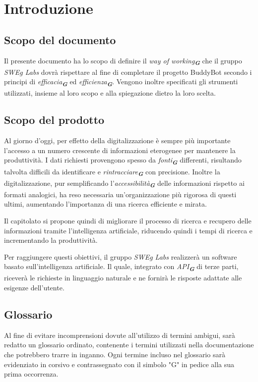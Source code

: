 


\section{Introduzione}
\label{sec:introduzione}

\subsection{Scopo del documento}
Il presente documento ha lo scopo di definire il \emph{way of working}\textsubscript{\textit{\textbf{G}}} che il gruppo \emph{SWEg Labs} dovrà rispettare al fine di completare il progetto BuddyBot secondo i principi di \emph{efficacia}\textsubscript{\textit{\textbf{G}}} ed \emph{efficienza}\textsubscript{\textit{\textbf{G}}}.
Vengono inoltre specificati gli strumenti utilizzati, insieme al loro scopo e alla spiegazione dietro la loro scelta.
\subsection{Scopo del prodotto}
Al giorno d'oggi, per effetto della digitalizzazione è sempre più importante l'accesso a un numero crescente di informazioni eterogenee per mantenere la produttività. I dati richiesti provengono spesso da  \emph{fonti}\textsubscript{\textit{\textbf{G}}} differenti, risultando talvolta difficili da identificare e  \emph{rintracciare}\textsubscript{\textit{\textbf{G}}} con precisione. Inoltre la digitalizzazione, pur semplificando l'\emph{accessibilità}\textsubscript{\textit{\textbf{G}}} delle informazioni rispetto ai formati analogici, ha reso necessaria un'organizzazione più rigorosa di questi ultimi, aumentando l'importanza di una ricerca efficiente e mirata.

Il capitolato si propone quindi di migliorare il processo di ricerca e recupero delle informazioni tramite l'intelligenza artificiale, riducendo quindi i tempi di ricerca e incrementando la produttività.

Per raggiungere questi obiettivi, il gruppo \emph{SWEg Labs} realizzerà un software basato sull'intelligenza artificiale. Il quale, integrato con \emph{API}\textsubscript{\textit{\textbf{G}}} di terze parti, riceverà le richieste in linguaggio naturale e ne fornirà le risposte adattate alle esigenze dell'utente.
\subsection{Glossario}
Al fine di evitare incomprensioni dovute all'utilizzo di termini ambigui, sarà redatto un glossario ordinato, contenente i termini utilizzati nella documentazione che potrebbero trarre in inganno. Ogni termine incluso nel glossario sarà evidenziato in corsivo e contrassegnato con il simbolo "G" in pedice alla sua prima occorrenza.

